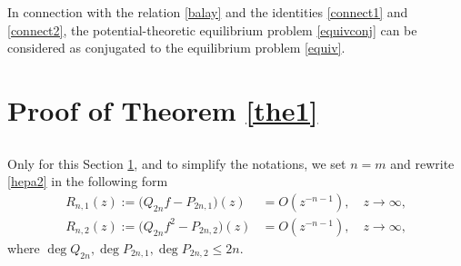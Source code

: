 \documentclass[11pt, a4paper, twoside]{article}
\let\leq\leqslant
\def\mdeg{\operatorname{deg}}
\theoremstyle{plain}
\theoremstyle{definition}
\begin{document}
In connection with the relation \eqref{balay} and the identities \eqref{connect1} and \eqref{connect2}, the potential-theoretic equilibrium problem \eqref{equivconj} can be considered as conjugated to the equilibrium problem \eqref{equiv}.



\section{Proof of Theorem \ref{the1}}\label{s3}

\subsection{}\label{s3s1}
Only for this Section \ref{s3}, and to simplify the notations,
we set $n=m$ and rewrite \eqref{hepa2} in the following form
\begin{align}
R_{n,1}(z):=
\bigl(Q_{2n}f-P_{2n,1}\bigr)(z)
&=O(z^{-n-1}),\quad z\to\infty,
\label{hepa2n1}\\
R_{n,2}(z):=
\bigl(Q_{2n}f^2-P_{2n,2}\bigr)(z)
&=O(z^{-n-1}),\quad z\to\infty,
\label{hepa2n2}
\end{align}
where $\mdeg{Q_{2n}},\mdeg{P_{2n,1}},\mdeg{P_{2n,2}}\leq{2n}$.
\end{document}
